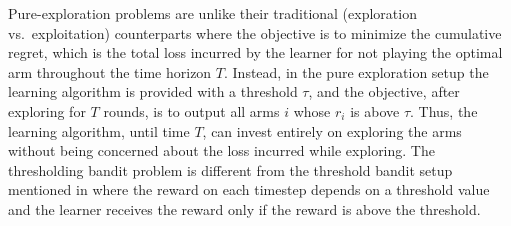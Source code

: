 %
%

Pure-exploration problems are unlike their traditional (exploration vs.\ exploitation) counterparts where the  objective is to minimize the cumulative regret, which is the total loss incurred by the learner for not playing the optimal arm throughout the time horizon $T$. Instead, in the pure exploration setup the learning algorithm is provided with a threshold $\tau$, and the objective, after exploring for $T$ rounds, is to  output all arms $i$ whose $r_{i}$ is above $\tau$. Thus, the learning algorithm, until  time $T$, can invest entirely on exploring the arms  without being concerned about the loss incurred while exploring. The thresholding bandit problem is different from the threshold bandit setup mentioned in \cite{abernethy2016threshold} where the reward on each timestep depends on a threshold value and the learner receives the reward only if the reward is above the threshold.



